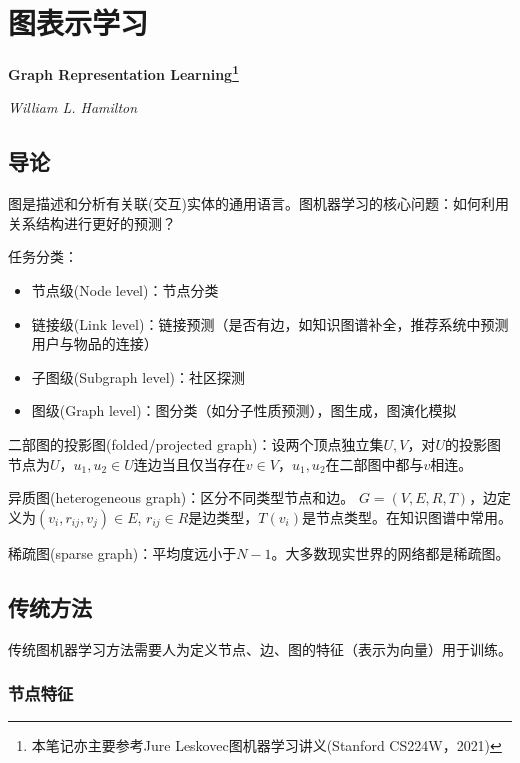 
\chapter{图表示学习}
\Large\textbf{Graph Representation Learning\footnote{本笔记亦主要参考Jure Leskovec图机器学习讲义(Stanford CS224W，2021)}}
\par \emph{William L. Hamilton} \normalsize

\section{导论}

\par 图是描述和分析有关联(交互)实体的通用语言。图机器学习的核心问题：如何利用关系结构进行更好的预测？

\par 任务分类：
\begin{itemize}
    \item 节点级(Node level)：节点分类
    \item 链接级(Link level)：链接预测（是否有边，如知识图谱补全，推荐系统中预测用户与物品的连接）
    \item 子图级(Subgraph level)：社区探测
    \item 图级(Graph level)：图分类（如分子性质预测），图生成，图演化模拟
\end{itemize}

\par 二部图的投影图(folded/projected graph)：设两个顶点独立集$U,V$，对$U$的投影图节点为$U$，$u_1,u_2\in U$连边当且仅当存在$v\in V$，$u_1,u_2$在二部图中都与$v$相连。

\par 异质图(heterogeneous graph)：区分不同类型节点和边。 $G=(V,E,R,T)$，边定义为$(v_i,r_{ij},v_j)\in E$, $r_{ij}\in R$是边类型，$T(v_i)$是节点类型。在知识图谱中常用。

\par 稀疏图(sparse graph)：平均度远小于$N-1$。大多数现实世界的网络都是稀疏图。

\section{传统方法}

\par 传统图机器学习方法需要人为定义节点、边、图的特征（表示为向量）用于训练。

\subsection{节点特征}


